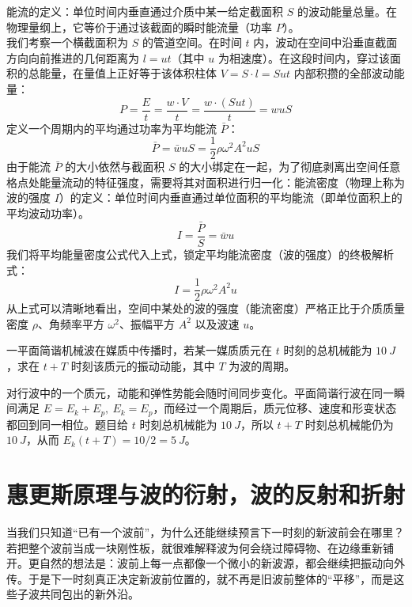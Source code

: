 \documentclass[lang=cn,11pt]{elegantbook}
\begin{document}
\begin{definition}[能流和能流密度]
能流的定义：单位时间内垂直通过介质中某一给定截面积 $S$ 的波动能量总量。在物理量纲上，它等价于通过该截面的瞬时能流量（功率 $P$）。\\
我们考察一个横截面积为 $S$ 的管道空间。在时间 $t$ 内，波动在空间中沿垂直截面方向向前推进的几何距离为 $l = u t$（其中 $u$ 为相速度）。在这段时间内，穿过该面积的总能量，在量值上正好等于该体积柱体 $V = S \cdot l = S u t$ 内部积攒的全部波动能量：$$P = \frac{E}{t} = \frac{w \cdot V}{t} = \frac{w \cdot (S u t)}{t} = w u S$$定义一个周期内的平均通过功率为平均能流 $\bar{P}$：$$\boxed{\bar{P} = \bar{w} u S = \frac{1}{2} \rho \omega^2 A^2 u S}$$
由于能流 $\bar{P}$ 的大小依然与截面积 $S$ 的大小绑定在一起，为了彻底剥离出空间任意格点处能量流动的特征强度，需要将其对面积进行归一化：能流密度（物理上称为波的强度 $I$）的定义：单位时间内垂直通过单位面积的平均能流（即单位面积上的平均波动功率）。$$I = \frac{\bar{P}}{S} = \bar{w} u$$我们将平均能量密度公式代入上式，锁定平均能流密度（波的强度）的终极解析式：$$\boxed{I = \frac{1}{2} \rho \omega^2 A^2 u}$$从上式可以清晰地看出，空间中某处的波的强度（能流密度）严格正比于介质质量密度 $\rho$、角频率平方 $\omega^2$、振幅平方 $A^2$ 以及波速 $u$。
\end{definition}

\begin{exercise}
一平面简谐机械波在媒质中传播时，若某一媒质质元在 \(t\) 时刻的总机械能为 \(\SI{10}{J}\)，求在 \(t+T\) 时刻该质元的振动动能，其中 \(T\) 为波的周期。
\end{exercise}

\begin{solution}
对行波中的一个质元，动能和弹性势能会随时间同步变化。平面简谐行波在同一瞬间满足 \(E=E_k+E_p,\ E_k=E_p\)，而经过一个周期后，质元位移、速度和形变状态都回到同一相位。题目给 \(t\) 时刻总机械能为 \(\SI{10}{J}\)，所以 \(t+T\) 时刻总机械能仍为 \(\SI{10}{J}\)，从而 \(E_k(t+T)=10/2=\SI{5}{J}\)。
\end{solution}

\section{惠更斯原理与波的衍射，波的反射和折射}

 当我们只知道“已有一个波前”，为什么还能继续预言下一时刻的新波前会在哪里？若把整个波前当成一块刚性板，就很难解释波为何会绕过障碍物、在边缘重新铺开。更自然的想法是：波前上每一点都像一个微小的新波源，都会继续把振动向外传。于是下一时刻真正决定新波前位置的，就不再是旧波前整体的“平移”，而是这些子波共同包出的新外沿。
\end{document}
